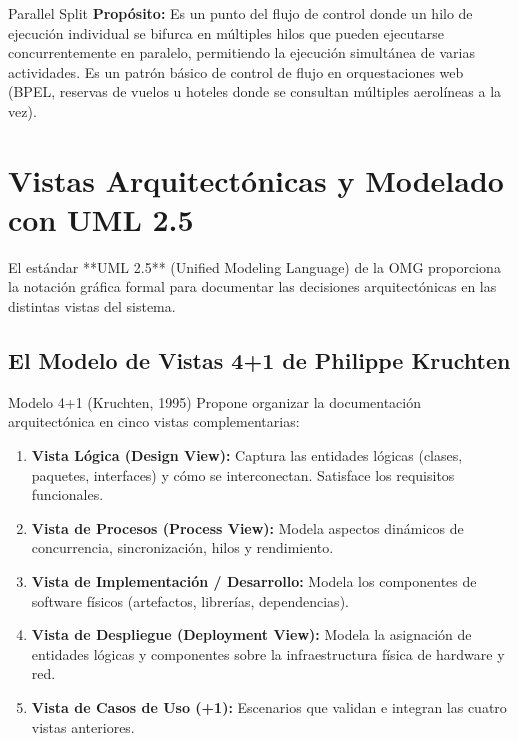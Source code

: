 \begin{patronarquitectura}{Parallel Split}
\textbf{Propósito:} Es un punto del flujo de control donde un hilo de ejecución individual se bifurca en múltiples hilos que pueden ejecutarse concurrentemente en paralelo, permitiendo la ejecución simultánea de varias actividades. Es un patrón básico de control de flujo en orquestaciones web (BPEL, reservas de vuelos u hoteles donde se consultan múltiples aerolíneas a la vez).
\end{patronarquitectura}

\section{Vistas Arquitectónicas y Modelado con UML 2.5}
\label{sec:modelado-uml}

El estándar **UML 2.5** (Unified Modeling Language) de la OMG proporciona la notación gráfica formal para documentar las decisiones arquitectónicas en las distintas vistas del sistema.

\subsection{El Modelo de Vistas 4+1 de Philippe Kruchten}

\begin{definicion}{Modelo 4+1 (Kruchten, 1995)}
Propone organizar la documentación arquitectónica en cinco vistas complementarias:
\begin{enumerate}[leftmargin=1.5em]
  \item \textbf{Vista Lógica (Design View):} Captura las entidades lógicas (clases, paquetes, interfaces) y cómo se interconectan. Satisface los requisitos funcionales.
  \item \textbf{Vista de Procesos (Process View):} Modela aspectos dinámicos de concurrencia, sincronización, hilos y rendimiento.
  \item \textbf{Vista de Implementación / Desarrollo:} Modela los componentes de software físicos (artefactos, librerías, dependencias).
  \item \textbf{Vista de Despliegue (Deployment View):} Modela la asignación de entidades lógicas y componentes sobre la infraestructura física de hardware y red.
  \item \textbf{Vista de Casos de Uso (+1):} Escenarios que validan e integran las cuatro vistas anteriores.
\end{enumerate}
\end{definicion}

